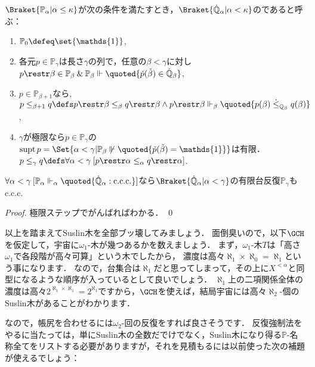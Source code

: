 \documentclass[a4j]{ltjsarticle}
\renewcommand{\emph}[1]{\textsf{\textgt{#1}}}
\begin{document}
\begin{definition}
 $\Braket{\mathbb{P}_\alpha | \alpha \leq \kappa}$が次の条件を満たすとき，$\Braket{\dot{\mathbb{Q}}_\alpha | \alpha < \kappa}$の\emph{有限台反復強制法}であると呼ぶ：
 \begin{enumerate}
  \item $\mathbb{P}_0 \defeq \set{\mathds{1}}$,
  \item 各元$p \in \mathbb{P}_\gamma$は長さ$\gamma$の列で，任意の$\beta < \gamma$に対し$p \restr \beta \in \mathbb{P}_\beta \mathbin{\&} \mathbb{P}_\beta \Vdash \quoted{\check{p}(\check{\beta}) \in \dot{\mathbb{Q}}_\beta}$,
  \item $p \in \mathbb{P}_{\beta + 1}$なら,
        $p \leq_{\beta+1} q \defs p \restr \beta \leq_\beta q \restr \beta \wedge p \restr \beta \Vdash_\beta \quoted{p(\beta) \mathrel{\dot{\leq}_{\mathbb{Q}_\beta}} q(\beta)}$,
  \item $\gamma$が極限なら$p \in \mathbb{P}_\gamma$の\emph{台}$\mathop{\mathrm{supt}}{p} = \Set{\alpha < \gamma | \mathbb{P}_\beta \not\Vdash \quoted{\check{p}(\check{\beta}) = \mathds{1}}}$は有限．
        $p \leq_\gamma q \defs \forall \alpha < \gamma \: [p\restr \alpha \leq_\alpha q \restr \alpha]$.
 \end{enumerate}
\end{definition}

\begin{fact}
 $\forall \alpha < \gamma \: [\mathbb{P}_\alpha \Vdash_\alpha \quoted{\dot{\mathbb{Q}}_\alpha: \text{c.c.c.}}]$なら$\Braket{\dot{\mathbb{Q}}_\alpha | \alpha < \gamma}$の有限台反復$\mathbb{P}_\gamma$もc.c.c.
\end{fact}
\begin{proof}
 極限ステップでがんばればわかる． \qed
\end{proof}

以上を踏まえてSuslin木を全部ブッ壊してみましょう．
面倒臭いので，以下$\GCH$を仮定して，宇宙に$\omega_1$-木が幾つあるかを数えましょう．
まず，$\omega_1$-木$T$は「高さ$\omega_1$で各段階が高々可算」という木でしたから，
濃度は高々$\aleph_1 \times \aleph_0 = \aleph_1$という事になります．
なので，台集合は$\aleph_1$だと思ってしまって，その上に$X^{<\alpha}$と同型になるような順序が入っているとして良いでしょう．
$\aleph_1$上の二項関係全体の濃度は高々$2^{\aleph_1 \times \aleph_1} = 2^{\aleph_1}$ですから，$\GCH$を使えば，結局宇宙には高々$\aleph_2$-個のSuslin木があることがわかります．

なので，帳尻を合わせるには$\omega_2$-回の反復をすれば良さそうです．
反復強制法をやるに当たっては，単にSuslin木の全数だでけでなく，Suslin木になり得る$\mathbb{P}$-名称全てをリストする必要がありますが，それを見積もるには以前使った次の補題が使えるでしょう：
\end{document}
